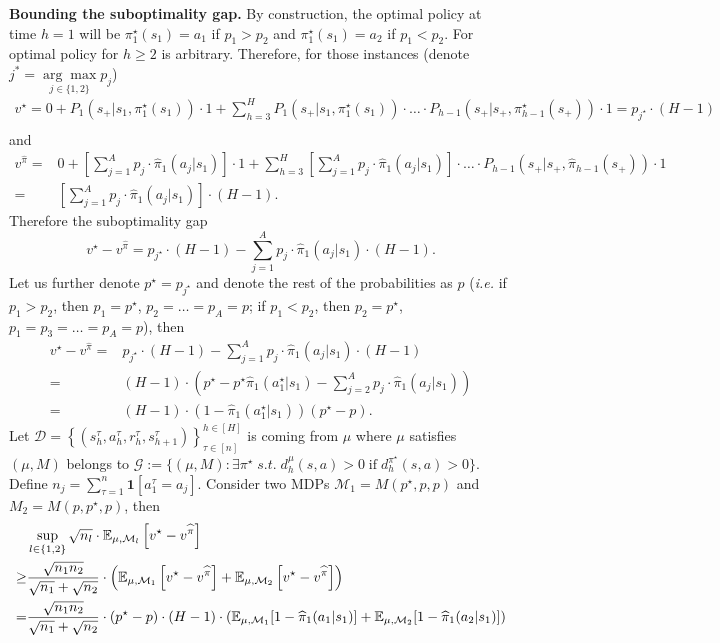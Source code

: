 \textbf{Bounding the suboptimality gap.} By construction, the optimal policy at time $h=1$ will be $\pi^\star_1(s_1)=a_1$ if $p_1>p_2$ and $\pi^\star_1(s_1)=a_2$ if $p_1<p_2$. For optimal policy for $h\geq 2$ is arbitrary. Therefore, for those instances (denote $j^{*}=\underset{j \in\{1,2\}}{\arg \max } p_{j}$)
\begin{align*}
v^\star=0+P_1(s_+|s_1,\pi^\star_1(s_1))\cdot 1+\sum_{h=3}^H P_1(s_+|s_1,\pi^\star_1(s_1))\cdot \ldots\cdot P_{h-1}(s_+|s_+,\pi^\star_{h-1}(s_+))\cdot 1=p_{j^\star}\cdot (H-1)\\
\end{align*}
and
\begin{align*}
v^{\widehat{\pi}}=&0+\left[\sum_{j=1}^A p_j\cdot\widehat{\pi}_1(a_j|s_1)\right]\cdot 1+\sum_{h=3}^H\left[\sum_{j=1}^A p_j\cdot\widehat{\pi}_1(a_j|s_1)\right]\cdot\ldots\cdot P_{h-1}(s_+|s_+,\widehat{\pi}_{h-1}(s_+))\cdot 1\\
=&\left[\sum_{j=1}^A p_j\cdot\widehat{\pi}_1(a_j|s_1)\right]\cdot (H-1).
\end{align*}
Therefore the suboptimality gap 
\[
v^\star-v^{\widehat{\pi}}=p_{j^\star}\cdot (H-1)-\sum_{j=1}^A p_j\cdot\widehat{\pi}_1(a_j|s_1)\cdot (H-1).
\]
Let us further denote $p^\star=p_{j^\star}$ and denote the rest of the probabilities as $p$ (\emph{i.e.} if $p_1>p_2$, then $p_1=p^\star$, $p_2=\ldots=p_A=p$; if $p_1<p_2$, then $p_2=p^\star$, $p_1=p_3=\ldots=p_A=p$), then 
\begin{align*}
v^\star-v^{\widehat{\pi}}=&p_{j^\star}\cdot (H-1)-\sum_{j=1}^A p_j\cdot\widehat{\pi}_1(a_j|s_1)\cdot (H-1)\\
=&(H-1)\cdot\left(p^\star-p^\star\widehat{\pi}_1(a_1^\star|s_1)-\sum_{j=2}^A p_j\cdot\widehat{\pi}_1(a_j|s_1)\right)\\
=&(H-1)\cdot\left(1-\widehat{\pi}_1(a_1^\star|s_1)\right)(p^\star-p).
\end{align*}
Let {\small$\mathcal{D}=\left\{\left(s_{h}^{\tau}, a_{h}^{\tau}, r_{h}^{\tau}, s_{h+1}^{\tau}\right)\right\}_{\tau\in[n]}^{h \in[H]}$} is coming from $\mu$ where $\mu$ satisfies $(\mu,M)$ belongs to $\mathcal{G}:=\{(\mu,M): \exists \pi^\star\;s.t. \; d^\mu_h(s,a)>0\;\text{if}\;d^{\pi^\star}_h(s,a)>0\}$.
Define $n_j=\sum_{\tau=1}^n \mathbf{1}[a_1^\tau=a_j]$. Consider two MDPs $\mathcal{M}_1=M(p^\star,p,p)$ and $M_2=M(p,p^\star,p)$, then 
\begin{equation}\label{eqn:lower_1}
\begin{aligned}
&\sup_{l\in\{1,2\}}\sqrt{n_l}\cdot\mathbb{E}_{\mu,\mathcal{M}_l}\left[v^\star-v^{\widehat{\pi}}\right]\\
\geq&\frac{\sqrt{n_1n_2}}{\sqrt{n_1}+\sqrt{n_2}}\cdot\left(\mathbb{E}_{\mu,\mathcal{M}_1}\left[v^\star-v^{\widehat{\pi}}\right]+\mathbb{E}_{\mu,\mathcal{M}_2}\left[v^\star-v^{\widehat{\pi}}\right]\right)\\
=&\frac{\sqrt{n_1n_2}}{\sqrt{n_1}+\sqrt{n_2}}\cdot(p^\star-p)\cdot (H-1) \cdot\left(\mathbb{E}_{\mu,\mathcal{M}_1}[1-\widehat{\pi}_1(a_1|s_1)]+\mathbb{E}_{\mu,\mathcal{M}_2}[1-\widehat{\pi}_1(a_2|s_1)]\right)
\end{aligned}
\end{equation}
